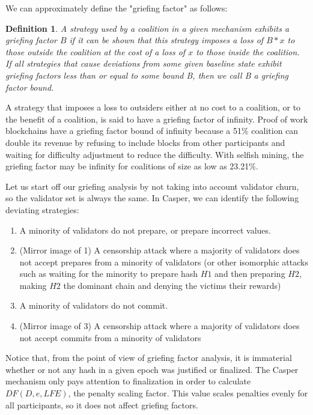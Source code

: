 \documentclass[12pt]{article}
\newtheorem{definition}{Definition}
\begin{document}
We can approximately define the "griefing factor" as follows:

\begin{definition}
A strategy used by a coalition in a given mechanism exhibits a \textit{griefing factor} $B$ if it can be shown that this strategy imposes a loss of $B * x$ to those outside the coalition at the cost of a loss of $x$ to those inside the coalition. If all strategies that cause deviations from some given baseline state exhibit griefing factors less than or equal to some bound B, then we call B a \textit{griefing factor bound}.
\end{definition}

A strategy that imposes a loss to outsiders either at no cost to a coalition, or to the benefit of a coalition, is said to have a griefing factor of infinity. Proof of work blockchains have a griefing factor bound of infinity because a 51\% coalition can double its revenue by refusing to include blocks from other participants and waiting for difficulty adjustment to reduce the difficulty. With selfish mining, the griefing factor may be infinity for coalitions of size as low as 23.21\%.

Let us start off our griefing analysis by not taking into account validator churn, so the validator set is always the same. In Casper, we can identify the following deviating strategies:

\begin{enumerate}
\item A minority of validators do not prepare, or prepare incorrect values.
\item (Mirror image of 1) A censorship attack where a majority of validators does not accept prepares from a minority of validators (or other isomorphic attacks such as waiting for the minority to prepare hash $H1$ and then preparing $H2$, making $H2$ the dominant chain and denying the victims their rewards)
\item A minority of validators do not commit.
\item (Mirror image of 3) A censorship attack where a majority of validators does not accept commits from a minority of validators
\end{enumerate}

Notice that, from the point of view of griefing factor analysis, it is immaterial whether or not any hash in a given epoch was justified or finalized. The Casper mechanism only pays attention to finalization in order to calculate $DF(D, e, LFE)$, the penalty scaling factor. This value scales penalties evenly for all participants, so it does not affect griefing factors.
\end{document}
